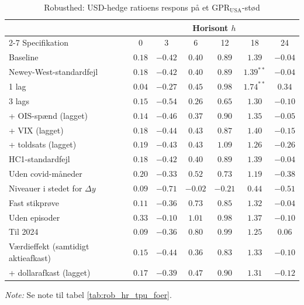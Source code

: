 \begin{table}[H]
\centering
\caption{Robusthed: USD-hedge ratioens respons på et $\text{GPR}_{\text{USA}}$-stød}
\label{tab:rob_hr_gpr_usa}
\begin{threeparttable}
\begin{tabular}{lcccccc}
\toprule
 & \multicolumn{6}{c}{Horisont $h$} \\
\cmidrule(lr){2-7}
Specifikation & 0 & 3 & 6 & 12 & 18 & 24 \\
\midrule
Baseline & $0.18$ & $-0.42$ & $0.40$ & $0.89$ & $1.39$ & $-0.04$ \\
Newey-West-standardfejl & $0.18$ & $-0.42$ & $0.40$ & $0.89$ & $1.39^{**}$ & $-0.04$ \\
1 lag & $0.04$ & $-0.27$ & $0.45$ & $0.98$ & $1.74^{**}$ & $0.34$ \\
3 lags & $0.15$ & $-0.54$ & $0.26$ & $0.65$ & $1.30$ & $-0.10$ \\
+ OIS-spænd (lagget) & $0.14$ & $-0.46$ & $0.37$ & $0.90$ & $1.35$ & $-0.05$ \\
+ VIX (lagget) & $0.18$ & $-0.44$ & $0.43$ & $0.87$ & $1.40$ & $-0.15$ \\
+ toldsats (lagget) & $0.19$ & $-0.43$ & $0.43$ & $1.09$ & $1.26$ & $-0.26$ \\
HC1-standardfejl & $0.18$ & $-0.42$ & $0.40$ & $0.89$ & $1.39$ & $-0.04$ \\
Uden covid-måneder & $0.20$ & $-0.33$ & $0.52$ & $0.73$ & $1.19$ & $-0.38$ \\
Niveauer i stedet for $\Delta y$ & $0.09$ & $-0.71$ & $-0.02$ & $-0.21$ & $0.44$ & $-0.51$ \\
Fast stikprøve & $0.11$ & $-0.36$ & $0.73$ & $0.85$ & $1.32$ & $-0.04$ \\
Uden episoder & $0.33$ & $-0.10$ & $1.01$ & $0.98$ & $1.37$ & $-0.10$ \\
Til 2024 & $0.09$ & $-0.36$ & $0.80$ & $0.99$ & $1.25$ & $0.06$ \\
Værdieffekt (samtidigt aktieafkast) & $0.15$ & $-0.44$ & $0.36$ & $0.83$ & $1.33$ & $-0.10$ \\
+ dollarafkast (lagget) & $0.17$ & $-0.39$ & $0.47$ & $0.90$ & $1.31$ & $-0.12$ \\
\bottomrule
\end{tabular}
\begin{tablenotes}[flushleft]\footnotesize
\item \textit{Note:} Se note til tabel \ref{tab:rob_hr_tpu_foer}.
\end{tablenotes}
\end{threeparttable}
\end{table}